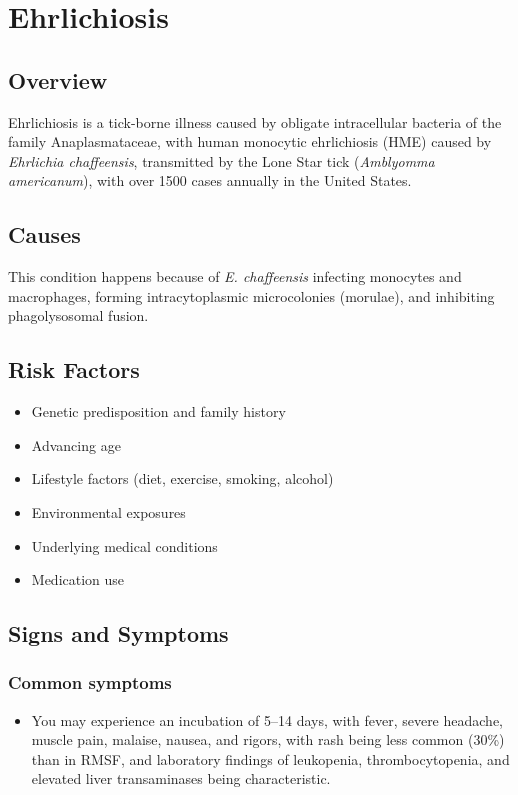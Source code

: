 \chapter{Ehrlichiosis}
\label{sec:Ehrlichiosis}

\section{Overview}
Ehrlichiosis is a tick-borne illness caused by obligate intracellular bacteria of the family Anaplasmataceae, with human monocytic ehrlichiosis (HME) caused by \textit{Ehrlichia chaffeensis}, transmitted by the Lone Star tick (\textit{Amblyomma americanum}), with over 1500 cases annually in the United States.
\section{Causes}
This condition happens because of \textit{E. chaffeensis} infecting monocytes and macrophages, forming intracytoplasmic microcolonies (morulae), and inhibiting phagolysosomal fusion.     
\section{Risk Factors}

\begin{itemize}[noitemsep]
  \item Genetic predisposition and family history
  \item Advancing age
  \item Lifestyle factors (diet, exercise, smoking, alcohol)
  \item Environmental exposures
  \item Underlying medical conditions
  \item Medication use
\end{itemize}
\section{Signs and Symptoms}

\subsection{Common symptoms}
\begin{itemize}[noitemsep]
  \item You may experience an incubation of 5--14 days, with fever, severe headache, muscle pain, malaise, nausea, and rigors, with rash being less common (30\%) than in RMSF, and laboratory findings of leukopenia, thrombocytopenia, and elevated liver transaminases being characteristic. 
  \end{itemize}

